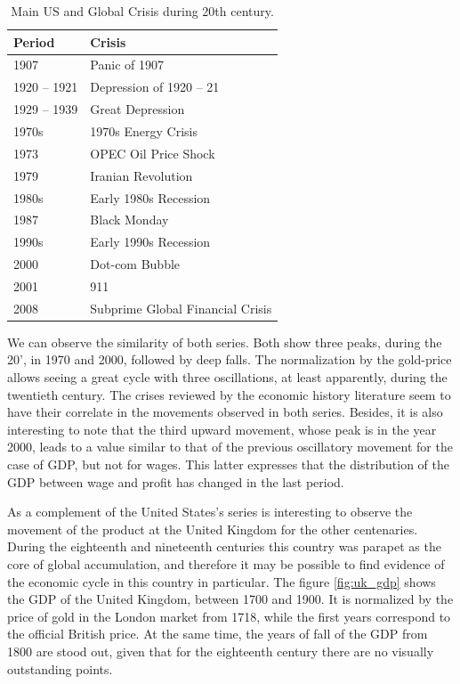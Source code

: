 \documentclass[a4paper]{article}
\begin{document}
	
	\begin{table}[ht]
		\centering
		\begin{tabular}{ll}
			\hline
			Period & Crisis \\ 
			\hline
			1907 & Panic of 1907 \\ 
			1920 – 1921 & Depression of 1920 – 21 \\ 
			1929 – 1939 & Great Depression \\ 
			1970s & 1970s Energy Crisis \\ 
			1973 & OPEC Oil Price Shock \\ 
			1979 & Iranian Revolution\\ 
			1980s & Early 1980s Recession\\ 
			1987 & Black Monday \\ 
			1990s & Early 1990s Recession\\ 
			2000 & Dot-com Bubble \\ 
			2001 & 911 \\ 
			2008 & Subprime Global Financial Crisis \\ 
			\hline
		\end{tabular}
		\caption{Main US and Global Crisis during 20th century.}
		\label{tabla_crisis}
	\end{table}
	
	We can observe the similarity of both series. Both show three peaks, during the 20', in 1970 and 2000, followed by deep falls. The normalization by the gold-price allows seeing a great cycle with three oscillations, at least apparently, during the twentieth century. The crises reviewed by the economic history literature seem to have their correlate in the movements observed in both series. Besides, it is also interesting to note that the third upward movement, whose peak is in the year 2000, leads to a value similar to that of the previous oscillatory movement for the case of GDP, but not for wages. This latter expresses that the distribution of the GDP between wage and profit has changed in the last period.
	
	As a complement of the United States's series is interesting to observe the movement of the product at the United Kingdom for the other centenaries. During the eighteenth and nineteenth centuries this country was parapet as the core of global accumulation, and therefore it may be possible to find evidence of the economic cycle in this country in particular. The figure \ref{fig:uk_gdp} shows the GDP of the United Kingdom, between 1700 and 1900. It is normalized by the price of gold in the London market from 1718, while the first years correspond to the official British price. At the same time, the years of fall of the GDP from 1800 are stood out, given that for the eighteenth century there are no visually outstanding points.
	
\end{document}
